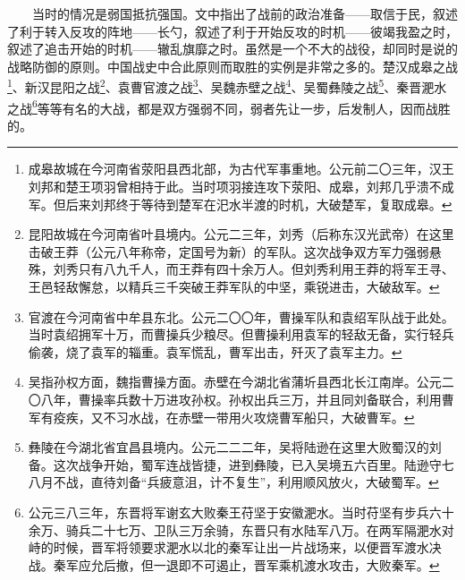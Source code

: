 \documentclass[cn,11pt,chinese]{elegantbook}
\begin{document}
　　当时的情况是弱国抵抗强国。文中指出了战前的政治准备——取信于民，叙述了利于转入反攻的阵地——长勺，叙述了利于开始反攻的时机——彼竭我盈之时，叙述了追击开始的时机——辙乱旗靡之时。虽然是一个不大的战役，却同时是说的战略防御的原则。中国战史中合此原则而取胜的实例是非常之多的。楚汉成皋之战\footnote[31]{ 成皋故城在今河南省荥阳县西北部，为古代军事重地。公元前二〇三年，汉王刘邦和楚王项羽曾相持于此。当时项羽接连攻下荥阳、成皋，刘邦几乎溃不成军。但后来刘邦终于等待到楚军在汜水半渡的时机，大破楚军，复取成皋。}、新汉昆阳之战\footnote[32]{ 昆阳故城在今河南省叶县境内。公元二三年，刘秀（后称东汉光武帝）在这里击破王莽（公元八年称帝，定国号为新）的军队。这次战争双方军力强弱悬殊，刘秀只有八九千人，而王莽有四十余万人。但刘秀利用王莽的将军王寻、王邑轻敌懈怠，以精兵三千突破王莽军队的中坚，乘锐进击，大破敌军。}、袁曹官渡之战\footnote[33]{ 官渡在今河南省中牟县东北。公元二〇〇年，曹操军队和袁绍军队战于此处。当时袁绍拥军十万，而曹操兵少粮尽。但曹操利用袁军的轻敌无备，实行轻兵偷袭，烧了袁军的辎重。袁军慌乱，曹军出击，歼灭了袁军主力。}、吴魏赤壁之战\footnote[34]{ 吴指孙权方面，魏指曹操方面。赤壁在今湖北省蒲圻县西北长江南岸。公元二〇八年，曹操率兵数十万进攻孙权。孙权出兵三万，并且同刘备联合，利用曹军有疫疾，又不习水战，在赤壁一带用火攻烧曹军船只，大破曹军。}、吴蜀彝陵之战\footnote[35]{ 彝陵在今湖北省宜昌县境内。公元二二二年，吴将陆逊在这里大败蜀汉的刘备。这次战争开始，蜀军连战皆捷，进到彝陵，已入吴境五六百里。陆逊守七八月不战，直待刘备“兵疲意沮，计不复生”，利用顺风放火，大破蜀军。}、秦晋淝水之战\footnote[36]{ 公元三八三年，东晋将军谢玄大败秦王苻坚于安徽淝水。当时苻坚有步兵六十余万、骑兵二十七万、卫队三万余骑，东晋只有水陆军八万。在两军隔淝水对峙的时候，晋军将领要求淝水以北的秦军让出一片战场来，以便晋军渡水决战。秦军应允后撤，但一退即不可遏止，晋军乘机渡水攻击，大败秦军。}等等有名的大战，都是双方强弱不同，弱者先让一步，后发制人，因而战胜的。\\
\end{document}
